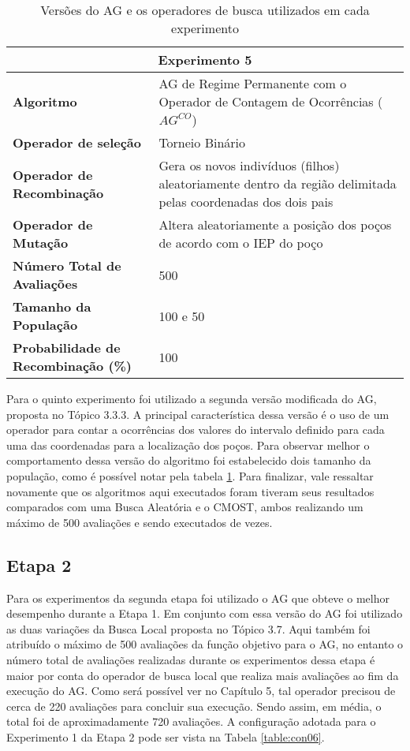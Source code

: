 \begin{table}[H]
\centering
\caption{Versões do AG e os operadores de busca utilizados em cada experimento}
\label{table:con05}
\begin{tabular}{|p{6cm}|p{9cm}|}
\hline
 
 \multicolumn{2}{|c|}{\textbf{Experimento 5}} \\ \hline
\textbf{Algoritmo} &AG de Regime Permanente com o Operador de Contagem de Ocorrências ($AG^{CO}$) \\ \hline
\textbf{Operador de seleção} & Torneio Binário \\ \hline
\textbf{Operador de Recombinação} & Gera os novos indivíduos (filhos) aleatoriamente dentro da região delimitada pelas coordenadas dos dois pais \\  \hline
\textbf{Operador de Mutação} & Altera aleatoriamente a posição dos poços de acordo com o IEP do poço \\ \hline
\textbf{Número Total de Avaliações} & 500 \\ \hline
\textbf{Tamanho da População} & 100 e 50 \\ \hline
\textbf{Probabilidade de Recombinação (\%)} & 100 \\ \hline
\end{tabular}
\end{table} 

Para o quinto experimento foi utilizado a segunda versão modificada do AG, proposta no Tópico 3.3.3. A principal característica dessa versão é o uso de um operador para contar a ocorrências dos valores do intervalo definido para cada uma das coordenadas para a localização dos poços. Para observar melhor o comportamento dessa versão do algoritmo foi estabelecido dois tamanho da população, como é possível notar pela tabela \ref{table:con05}. Para finalizar, vale ressaltar novamente que os algoritmos aqui executados foram tiveram seus resultados comparados com uma Busca Aleatória e o CMOST, ambos realizando um  máximo de 500 avaliações e sendo executados de vezes.

\subsection{Etapa 2}

Para os experimentos da segunda etapa foi utilizado o AG que obteve o melhor desempenho durante a Etapa 1. Em conjunto com essa versão do AG foi utilizado as duas variações da Busca Local proposta no Tópico 3.7. Aqui também foi atribuído o máximo de 500 avaliações da função objetivo  para o AG, no entanto o número total de avaliações realizadas durante os experimentos dessa etapa é maior por conta do operador de busca local que realiza mais avaliações ao fim da execução do AG. Como será possível ver no Capítulo 5, tal operador precisou de cerca de 220 avaliações para concluir sua execução. Sendo assim, em média, o total foi de aproximadamente 720 avaliações. A configuração adotada para o Experimento 1 da Etapa 2 pode ser vista na Tabela \ref{table:con06}.


